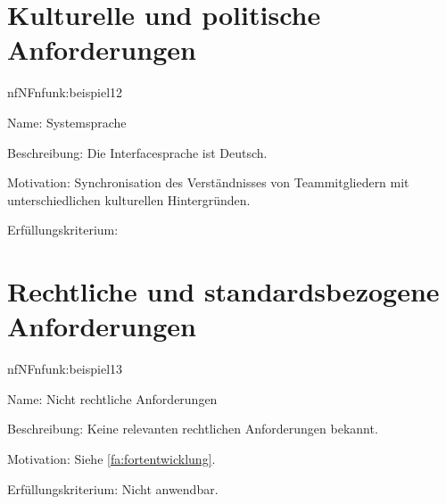 \section{Kulturelle und politische Anforderungen}


\begin{description}[leftmargin=5em, style=sameline]	
	\begin{lhp}{nf}{NF}{nfunk:beispiel12}
		\item [Name:] Systemsprache
		\item [Beschreibung:] Die Interfacesprache ist Deutsch.
		\item [Motivation:] Synchronisation des Verständnisses von Teammitgliedern mit unterschiedlichen kulturellen Hintergründen.
		\item [Erfüllungskriterium:] 
	\end{lhp}
\end{description}

\section{Rechtliche und standardsbezogene Anforderungen}


\begin{description}[leftmargin=5em, style=sameline]	
	\begin{lhp}{nf}{NF}{nfunk:beispiel13}
		\item [Name:] Nicht rechtliche Anforderungen
		\item [Beschreibung:] Keine relevanten rechtlichen Anforderungen bekannt.
		\item [Motivation:] Siehe \ref{fa:fortentwicklung}.
		\item [Erfüllungskriterium:] Nicht anwendbar.
	\end{lhp}
\end{description}

